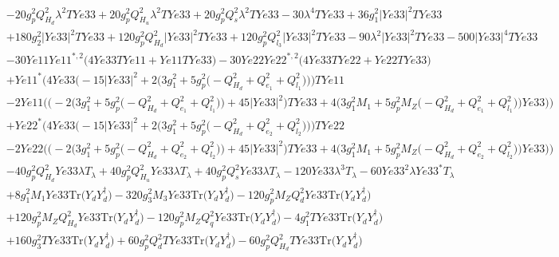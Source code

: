 \begin{align}
 &-20 g_{p}^{2} Q_{H_d}^{2} \lambda^{2} TYe33 +20 g_{p}^{2} Q_{H_u}^{2} \lambda^{2} TYe33 +20 g_{p}^{2} Q_{s}^{2} \lambda^{2} TYe33 -30 \lambda^{4} TYe33 +36 g_{1}^{2} |Ye33|^2 TYe33 \nonumber \\ 
 &+180 g_{2}^{2} |Ye33|^2 TYe33 +120 g_{p}^{2} Q_{H_d}^{2} |Ye33|^2 TYe33 +120 g_{p}^{2} Q_{l_3}^{2} |Ye33|^2 TYe33 -90 \lambda^{2} |Ye33|^2 TYe33 -500 |Ye33|^4 TYe33 \nonumber \\ 
 &-30 Ye11 Ye11^{*,2} \Big(4 Ye33 TYe11  + Ye11 TYe33 \Big)-30 Ye22 Ye22^{*,2} \Big(4 Ye33 TYe22  + Ye22 TYe33 \Big)\nonumber \\ 
 &+Ye11^* \Big(4 Ye33 \Big(-15 |Ye33|^2  + 2 \Big(3 g_{1}^{2}  + 5 g_{p}^{2} \Big(- Q_{H_d}^{2}  + Q_{e_{1}}^{2} + Q_{l_1}^{2}\Big)\Big)\Big)TYe11 \nonumber \\ 
 &-2 Ye11 \Big(\Big(-2 \Big(3 g_{1}^{2}  + 5 g_{p}^{2} \Big(- Q_{H_d}^{2}  + Q_{e_{1}}^{2} + Q_{l_1}^{2}\Big)\Big) + 45 |Ye33|^2 \Big)TYe33  + 4 \Big(3 g_{1}^{2} M_1  + 5 g_{p}^{2} M_Z \Big(- Q_{H_d}^{2}  + Q_{e_{1}}^{2} + Q_{l_1}^{2}\Big)\Big)Ye33 \Big)\Big)\nonumber \\ 
 &+Ye22^* \Big(4 Ye33 \Big(-15 |Ye33|^2  + 2 \Big(3 g_{1}^{2}  + 5 g_{p}^{2} \Big(- Q_{H_d}^{2}  + Q_{e_{2}}^{2} + Q_{l_2}^{2}\Big)\Big)\Big)TYe22 \nonumber \\ 
 &-2 Ye22 \Big(\Big(-2 \Big(3 g_{1}^{2}  + 5 g_{p}^{2} \Big(- Q_{H_d}^{2}  + Q_{e_{2}}^{2} + Q_{l_2}^{2}\Big)\Big) + 45 |Ye33|^2 \Big)TYe33  + 4 \Big(3 g_{1}^{2} M_1  + 5 g_{p}^{2} M_Z \Big(- Q_{H_d}^{2}  + Q_{e_{2}}^{2} + Q_{l_2}^{2}\Big)\Big)Ye33 \Big)\Big)\nonumber \\ 
 &-40 g_{p}^{2} Q_{H_d}^{2} Ye33 \lambda T_{\lambda} +40 g_{p}^{2} Q_{H_u}^{2} Ye33 \lambda T_{\lambda} +40 g_{p}^{2} Q_{s}^{2} Ye33 \lambda T_{\lambda} -120 Ye33 \lambda^{3} T_{\lambda} -60 Ye33^{2} \lambda Ye33^* T_{\lambda} \nonumber \\ 
 &+8 g_{1}^{2} M_1 Ye33 \mbox{Tr}\Big({Y_d  Y_{d}^{\dagger}}\Big) -320 g_{3}^{2} M_3 Ye33 \mbox{Tr}\Big({Y_d  Y_{d}^{\dagger}}\Big) -120 g_{p}^{2} M_Z Q_{d}^{2} Ye33 \mbox{Tr}\Big({Y_d  Y_{d}^{\dagger}}\Big) \nonumber \\ 
 &+120 g_{p}^{2} M_Z Q_{H_d}^{2} Ye33 \mbox{Tr}\Big({Y_d  Y_{d}^{\dagger}}\Big) -120 g_{p}^{2} M_Z Q_{q}^{2} Ye33 \mbox{Tr}\Big({Y_d  Y_{d}^{\dagger}}\Big) -4 g_{1}^{2} TYe33 \mbox{Tr}\Big({Y_d  Y_{d}^{\dagger}}\Big) \nonumber \\ 
 &+160 g_{3}^{2} TYe33 \mbox{Tr}\Big({Y_d  Y_{d}^{\dagger}}\Big) +60 g_{p}^{2} Q_{d}^{2} TYe33 \mbox{Tr}\Big({Y_d  Y_{d}^{\dagger}}\Big) -60 g_{p}^{2} Q_{H_d}^{2} TYe33 \mbox{Tr}\Big({Y_d  Y_{d}^{\dagger}}\Big) \nonumber \\ 

\end{align}
